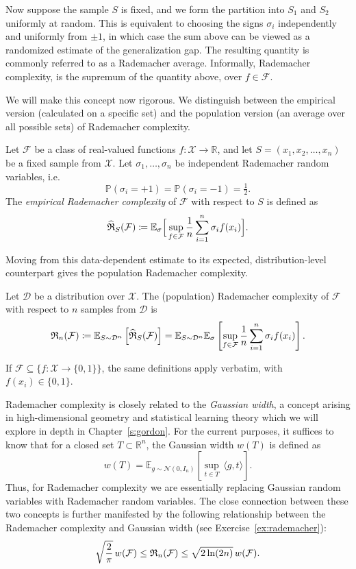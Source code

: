 Now suppose the sample $S$ is fixed, and we form the partition into $S_1$ and $S_2$ uniformly at random. This is equivalent to choosing the signs $\sigma_i$ independently and uniformly from ${\pm 1}$, in which case the sum above can be viewed as a randomized estimate of the generalization gap. 
The resulting quantity is commonly referred to as a Rademacher average. Informally, Rademacher complexity,  is the supremum of the quantity above, over $f \in {\mathcal F}$.

We will make this concept now rigorous. We distinguish between the empirical version (calculated on a specific set) and the population version (an average over all possible sets) of Rademacher complexity.

\begin{definition}\label{de:empiricalrademacher}
Let $\mathcal{F}$ be a class of real-valued functions $f : \mathcal{X} \to \mathbb{R}$, and let
$S = (x_1, x_2, \ldots, x_n)$ be a fixed sample from $\mathcal{X}$. Let $\sigma_1, \ldots, \sigma_n$ be independent Rademacher random variables, i.e.
$$
\mathbb{P}(\sigma_i = +1) = \mathbb{P}(\sigma_i = -1) = \tfrac12.
$$
The {\em empirical Rademacher complexity} of $\mathcal{F}$ with respect to $S$ is defined as
$$
\widehat{\mathfrak{R}}_S(\mathcal{F})
\coloneqq 
\mathbb{E}_{\sigma} \Big[
\sup_{f \in \mathcal{F}}
\frac{1}{n}
\sum_{i=1}^n \sigma_i  f(x_i)
\Big].
$$
\end{definition}
Moving from this data-dependent estimate to its expected, distribution-level counterpart gives the population Rademacher complexity.


\begin{definition}\label{de:empiricalrademacher}
Let ${\mathcal D}$ be a distribution over $\mathcal{X}$. The (population) Rademacher complexity of $\mathcal{F}$ with respect to $n$ samples from ${\mathcal D}$ is
$$
\mathfrak{R}_n(\mathcal{F})
\coloneqq
\mathbb{E}_{S \sim {\mathcal D}^n}
\left[\widehat{\mathfrak{R}}_S(\mathcal{F})
\right] =
\mathbb{E}_{S \sim {\mathcal D}^n} \mathbb{E}_{\sigma}
\left[\sup_{f \in \mathcal{F}} \frac{1}{n}
\sum_{i=1}^n \sigma_i f(x_i) \right].
$$
\end{definition}
If $\mathcal{F} \subseteq \{ f : \mathcal{X} \to \{0,1\} \}$, the same definitions apply verbatim, with $f(x_i) \in \{0,1\}$.

Rademacher complexity is closely related to the {\em Gaussian width}, a concept arising in high-dimensional geometry and statistical learning theory
which we will explore in depth in Chapter~\ref{s:gordon}. For the current purposes, it suffices to know that for a closed set $T \subset \mathbb{R}^n$, the Gaussian width $w(T)$ is defined as
$$w(T) = \mathbb{E}_{g \sim \mathcal{N}(0, I_n)} \left[ \sup_{t \in T} \,\langle g, t \rangle \right].$$
Thus, for Rademacher complexity we are essentially replacing Gaussian random variables with Rademacher random variables.
The close connection between these two concepts is further manifested  by the following relationship between the Rademacher complexity and Gaussian width (see Exercise~\ref{ex:rademacher}):
$$\sqrt{\frac{2}{\pi}}\,w(\mathcal{F}) \leq  \mathfrak{R}_n(\mathcal{F})\leq \sqrt{2 \ln(2n)} \,w(\mathcal{F}).$$

